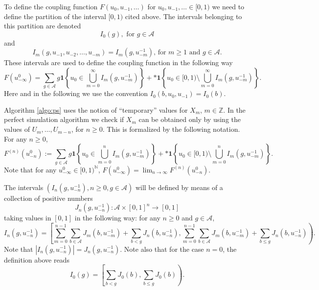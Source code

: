 \documentclass[a4paper]{article}
\newcommand{\Z}{\mathbb{Z}}
\newcommand{\N}{\mathbb{N}}
\newcommand{\A}{\mathcal{A}}
\begin{document}
\fi %


To define the coupling function $F(u_0,u_{-1},\ldots)$ for $u_0, u_{-1}, \ldots \in [0,1)$ we need to define the partition of the interval $[0,1)$ cited above. 
The intervals belonging to this partition are denoted
$$
I_0(g), \text{ for } g \in \A
$$
and
$$
I_m(g,  u_{-1},u_{-2},\ldots , u_{-m}) = I_m(g,  u_{-m}^{-1}) \text{, for } m\geq 1 \text{ and } g\in \A.
$$
These intervals are used to define the coupling function in the following way 
\begin{equation}\label{eq:I_m}
F(u_{-\infty}^{0})=\sum_{g\in \A}g \mathbf{1}\left\{u_0 \in \bigcup_{m=0}^{\infty}I_{m}(g,u_{-m}^{-1})\right\}+*\mathbf{1}\left\{u_0\in [0,1)\setminus \bigcup_{m=0}^{\infty}I_{m}(g,u_{-m}^{-1})\right\}.
\end{equation}
Here and in the following we use the convention $I_0(b,u_{0},u_{-1})=I_0(b)$. 

Algorithm \ref{algo:ps} uses the notion of ``temporary'' values for $X_m$, $m\in \Z$. In the perfect simulation algorithm we check if $X_m$ can be obtained only by using the values of $U_m,\ldots, U_{m-n}$, for $n\geq 0$. This is formalized by the following notation.
For any $n\geq 0$,
\begin{equation}\label{def:tempvalues}
F^{(n)}(u^0_{-n}):=\sum_{g\in \A}g \mathbf{1}\left\{u_0 \in \bigcup_{m=0}^{n}I_{m}(g,u^{-1}_{-m})\right\}+*\mathbf{1}\left\{u_0\in [0,1)\setminus \bigcup_{m=0}^{n}I_{m}(g,u^{-1}_{-m})\right\} . 
\end{equation}
Note that for any $u_{-\infty}^{0}\in[0,1)^{\N}$, $F(u^0_{-\infty})=\lim_{n\to\infty}F^{(n)}(u^0_{-n})$.

The intervals $
(I_n(g, u_{-n}^{-1}), n\geq 0, g\in \A) $  will be defined by means of a collection of positive numbers
$$
J_n(g,u_{-n}^{-1}): \A\times [0,1]^n \to [0,1]
$$ 
taking values in $ [0, 1]  $ in the following way:
for any $n\geq 0$ and $g\in \A$, 
\begin{equation}\label{eq:Ing}
    I_n(g, u_{-n}^{-1})= \left[\sum_{m=0}^{n-1}\sum_{b\in \A}J_m(b, u_{-m}^{-1})
 +\sum_{b< g}J_n(b,u_{-n}^{-1}), \sum_{m=0}^{n-1}\sum_{b\in \A}J_m(b,u_{-m}^{-1})
 +\sum_{b\leq g}J_n(b,u_{-n}^{-1})\right).
\end{equation}
Note that $|I_n(g,u_{-n}^{-1})|=J_n(g,u_{-n}^{-1})$. Note also that for the case $n=0$, the definition above reads
$$
I_0(g)= \left[\sum_{b< g}J_0(b), \sum_{b\leq g}J_0(b)\right).
$$
\end{document}
